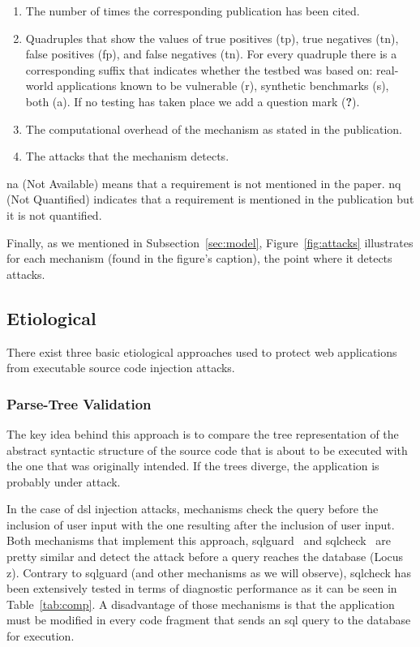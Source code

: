 \documentclass[conference]{IEEEtran}
\begin{document}
\begin{enumerate}
\item The number of times the corresponding publication has been cited.
\item Quadruples that show the values of true
positives ({\sc tp}), true negatives ({\sc tn}),
false positives ({\sc fp}), and false negatives
({\sc tn}). For every quadruple there is a corresponding
suffix that indicates whether the testbed was based
on: real-world applications known to be vulnerable
(r), synthetic benchmarks (s), both (a).
If no testing has taken place we add a question
mark ({\bf ?}).
\item The computational overhead of the
mechanism as stated in the publication.
\item The attacks that the mechanism detects.
\end{enumerate}

\noindent
{\sc na} (Not Available) means that a requirement is not
mentioned in the paper. {\sc nq} (Not Quantified)
indicates that a requirement is mentioned in the publication
but it is not quantified.

Finally, as we mentioned in Subsection~\ref{sec:model},
Figure~\ref{fig:attacks} illustrates for each mechanism (found in the
figure's caption), the point where it detects attacks.

\subsection{Etiological}
\label{sec:prot}

There exist three basic etiological approaches used to protect web
applications from executable source code injection attacks.

\subsubsection{Parse-Tree Validation}
\label{sec:tree}

The key idea behind this approach is to compare
the tree representation of the abstract syntactic
structure of the source code that is about to be
executed with the one that was originally intended.
If the trees diverge, the application is probably
under attack.

In the case of {\sc dsl} injection attacks, mechanisms check 
the query before the inclusion of user input with the one
resulting after the inclusion of user input.
Both mechanisms that implement this approach,
{\sc sqlg}uard~\cite{BWS05} and
{\sc sql}check~\cite{SW06} are pretty similar
and detect the attack before a query reaches the
database (Locus {\sc z}).
Contrary to {\sc sqlg}uard (and other
mechanisms as we will observe), {\sc sql}check has been
extensively tested in terms of diagnostic performance
as it can be seen in Table~\ref{tab:comp}.
A disadvantage of those mechanisms is that the
application must be modified in every code fragment
that sends an {\sc sql} query to the database for execution.
\end{document}
